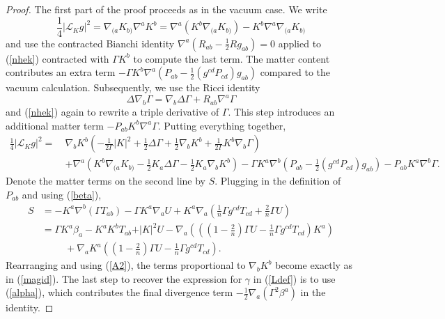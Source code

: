 \documentclass[11pt, reqno]{amsart}
\theoremstyle{plain}
\theoremstyle{definition}
\numberwithin{equation}{section}
\begin{document}
\begin{proof}
    The first part of the proof proceeds as in the vacuum case. We write
    \begin{equation*}
        \frac 14\vert \mathcal{L}_K g\vert^2 = \nabla_{(a}K_{b)}\nabla^aK^b = \nabla^a(K^b\nabla_{(a}K_{b)}) - K^b\nabla^a\nabla_{(a}K_{b)}
    \end{equation*}
    and use the contracted Bianchi identity $\nabla^a(R_{ab}-\frac 12 Rg_{ab}) = 0$ applied to (\ref{nhek}) contracted with $\Gamma K^b$ to compute the last term. The matter content contributes an extra term $-\Gamma K^b\nabla^a(P_{ab}-\frac 12(g^{cd}P_{cd})g_{ab})$ compared to the vacuum calculation. Subsequently, we use the Ricci identity 
    \begin{equation*}
        \Delta\nabla_b\Gamma = \nabla_b\Delta\Gamma + R_{ab}\nabla^a\Gamma
    \end{equation*}
    and (\ref{nhek}) again to rewrite a triple derivative of $\Gamma$. This step introduces an additional matter term $-P_{ab}K^b\nabla^a\Gamma$. Putting everything together,
        \begin{align*} 
        \frac 14\vert \mathcal{L}_K g \vert^2  = \:  &\nonumber\nabla_bK^b\left(-\frac{1}{2\Gamma}\vert K \vert^2 + \frac 12\Delta \Gamma + \frac 12\nabla_b K^b + \frac{1}{2\Gamma}K^b\nabla_b\Gamma \right) \\[3pt]&+\nabla^a\left(K^b\nabla_{(a}K_{b)} - \tfrac 12K_a\Delta \Gamma-\tfrac 12K_a\nabla_b K^b\right) - \Gamma K^a\nabla^b(P_{ab} - \tfrac 12(g^{cd}P_{cd})g_{ab}) - P_{ab}K^a\nabla^b\Gamma.
    \end{align*}
    Denote the matter terms on the second line by $S$. Plugging in the definition of $P_{ab}$ and using (\ref{beta}), 
    \begin{align*}
        S &= -K^a\nabla^b(\Gamma T_{ab}) - \Gamma K^a\nabla_a U + K^a\nabla_a\left(\tfrac 1n\Gamma g^{cd}T_{cd} + \tfrac 2n \Gamma U\right) \nonumber\\
        &= \Gamma K^a\beta_a - K^aK^bT_{ab} +  \vert K \vert^2U  - \nabla_a\left(((1-\tfrac 2n)\Gamma U - \tfrac 1n \Gamma g^{cd}T_{cd})K^a\right) \\&\hspace{1cm}+ \nabla_a K^a \left((1-\tfrac 2n)\Gamma U - \tfrac 1n \Gamma g^{cd}T_{cd}\right).
    \end{align*}
Rearranging and using (\ref{A2}), the terms proportional to $\nabla_b K^b$ become exactly as in (\ref{magid}). The last step to recover the expression for $\gamma$ in (\ref{Ldef}) is to use (\ref{alpha}), which contributes the final divergence term $-\frac 12\nabla_a (\Gamma^2 \beta^a)$ in the identity.
\end{proof}
\end{document}
